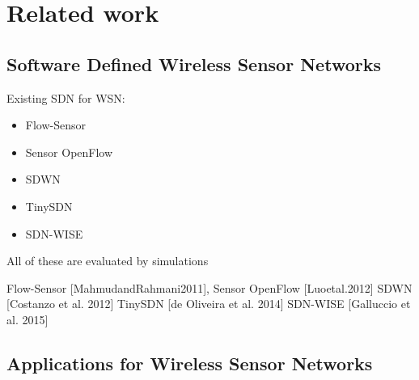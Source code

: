 \section{Related work}

\subsection{Software Defined Wireless Sensor Networks}


Existing SDN for WSN:
\begin{itemize}
\item	Flow-Sensor
\item	Sensor OpenFlow
\item	SDWN
\item	TinySDN
\item	SDN-WISE
\end{itemize}
All of these are evaluated by simulations


Flow-Sensor [MahmudandRahmani2011], 
Sensor OpenFlow [Luoetal.2012] 
SDWN [Costanzo et al. 2012]
TinySDN [de Oliveira et al. 2014]
SDN-WISE [Galluccio et al. 2015]

\subsection{Applications for Wireless Sensor Networks}

